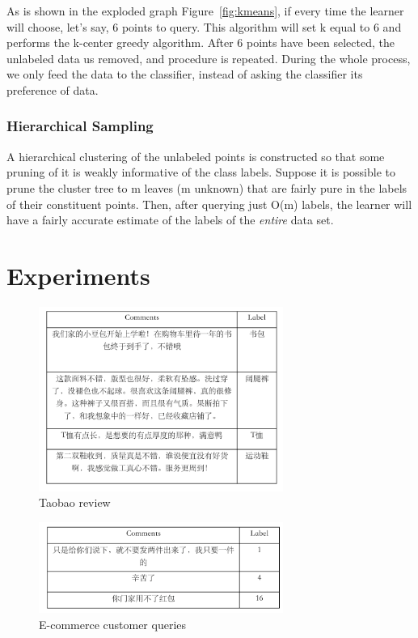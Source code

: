 \documentclass{acmtog}
\begin{document}
As is shown in the exploded graph Figure~\ref{fig:kmeans}, if every time the learner will choose, let’s say, 6 points to query.  This algorithm will set k equal to 6 and performs the k-center greedy algorithm. After 6 points have been selected, the unlabeled data us removed, and  procedure is repeated. During the whole process, we only feed the data to the classifier, instead of asking the classifier its preference of data. 
\subsubsection{Hierarchical Sampling}
A hierarchical clustering of the unlabeled points is constructed so that some pruning of it is weakly informative of the class labels. Suppose it is possible to prune the cluster tree to m leaves (m unknown) that are fairly pure in the labels of their constituent points. Then, after querying just O(m) labels, the learner will have a fairly accurate estimate of the labels of the \textit{entire} data set. 

\section{Experiments}
\begin{figure}[t]
\includegraphics[width=8cm]{tbdb}
\centering
\caption{Taobao review}
  \label{fig:tbdb}
\end{figure}
\begin{figure}[t]
\includegraphics[width=8cm]{ecdb}
\centering
\caption{E-commerce customer queries}
  \label{fig:ecdb}
\end{figure}
\end{document}

